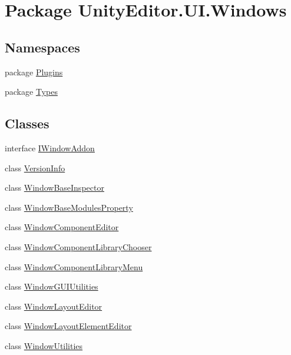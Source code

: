 \hypertarget{namespace_unity_editor_1_1_u_i_1_1_windows}{}\section{Package Unity\+Editor.\+U\+I.\+Windows}
\label{namespace_unity_editor_1_1_u_i_1_1_windows}
\subsection*{Namespaces}
\begin{DoxyCompactItemize}
\item 
package \hyperlink{namespace_unity_editor_1_1_u_i_1_1_windows_1_1_plugins}{Plugins}
\item 
package \hyperlink{namespace_unity_editor_1_1_u_i_1_1_windows_1_1_types}{Types}
\end{DoxyCompactItemize}
\subsection*{Classes}
\begin{DoxyCompactItemize}
\item 
interface \hyperlink{interface_unity_editor_1_1_u_i_1_1_windows_1_1_i_window_addon}{I\+Window\+Addon}
\item 
class \hyperlink{class_unity_editor_1_1_u_i_1_1_windows_1_1_version_info}{Version\+Info}
\item 
class \hyperlink{class_unity_editor_1_1_u_i_1_1_windows_1_1_window_base_inspector}{Window\+Base\+Inspector}
\item 
class \hyperlink{class_unity_editor_1_1_u_i_1_1_windows_1_1_window_base_modules_property}{Window\+Base\+Modules\+Property}
\item 
class \hyperlink{class_unity_editor_1_1_u_i_1_1_windows_1_1_window_component_editor}{Window\+Component\+Editor}
\item 
class \hyperlink{class_unity_editor_1_1_u_i_1_1_windows_1_1_window_component_library_chooser}{Window\+Component\+Library\+Chooser}
\item 
class \hyperlink{class_unity_editor_1_1_u_i_1_1_windows_1_1_window_component_library_menu}{Window\+Component\+Library\+Menu}
\item 
class \hyperlink{class_unity_editor_1_1_u_i_1_1_windows_1_1_window_g_u_i_utilities}{Window\+G\+U\+I\+Utilities}
\item 
class \hyperlink{class_unity_editor_1_1_u_i_1_1_windows_1_1_window_layout_editor}{Window\+Layout\+Editor}
\item 
class \hyperlink{class_unity_editor_1_1_u_i_1_1_windows_1_1_window_layout_element_editor}{Window\+Layout\+Element\+Editor}
\item 
class \hyperlink{class_unity_editor_1_1_u_i_1_1_windows_1_1_window_utilities}{Window\+Utilities}
\end{DoxyCompactItemize}
